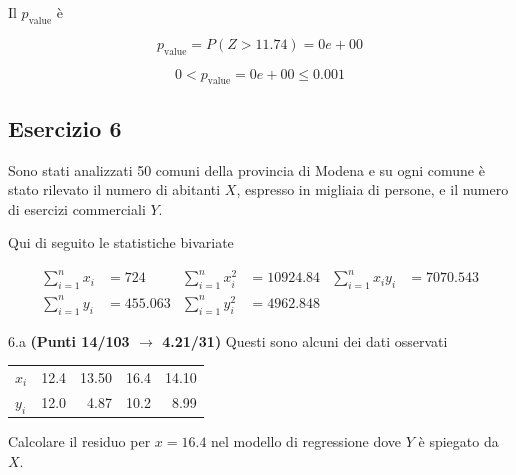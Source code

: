 \documentclass[
  11pt,
]{book}
\theoremstyle{mytheoremstyle}
\theoremstyle{mydefstyle}
\newenvironment{sol}
  {
  \begin{tcolorbox}[enhanced,breakable,arc=0.1mm,boxrule=1pt,colback=white,colframe=iblue,
  title=\bf \fontfamily{lmss}\selectfont \hspace{.5 cm} Soluzione,drop fuzzy shadow]

}{
\end{tcolorbox}
  }
\begin{document}
\begin{sol}
Il \(p_{\text{value}}\) è

\[ p_{\text{value}} = P(Z>11.74)=0e+00 \]

\[
 0 < p_\text{value}= 0e+00 \leq 0.001 
\]

\end{sol}

\subsection{Esercizio 6}\label{esercizio-6-13}

Sono stati analizzati 50 comuni della provincia di Modena e su ogni comune è stato rilevato
il numero di abitanti \(X\), espresso in migliaia di persone, e il numero di esercizi commerciali \(Y\).

Qui di seguito le statistiche bivariate

\begin{align*}
  \sum_{i=1}^n x_i &= 724 &\sum_{i=1}^n x_i^2 &= 10924.84 &\sum_{i=1}^n x_i y_i &= 7070.543\\
  \sum_{i=1}^n y_i &= 455.063 & \sum_{i=1}^n y_i^2 &= 4962.848 &
\end{align*}

6.a \textbf{(Punti 14/103 \(\rightarrow\) 4.21/31)} Questi sono alcuni dei dati osservati

\begin{table}[H]
\centering
\begin{tabular}{lrrrr}
\toprule
  &  &  &  & \\
\midrule
$x_i$ & 12.4 & 13.50 & 16.4 & 14.10\\
$y_i$ & 12.0 & 4.87 & 10.2 & 8.99\\
\bottomrule
\end{tabular}
\end{table}

Calcolare il residuo per \(x=16.4\) nel modello di regressione dove \(Y\) è spiegato da \(X\).
\end{document}
